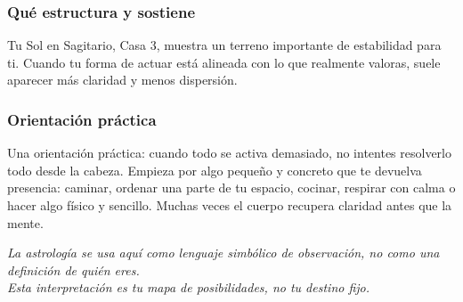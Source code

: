 \documentclass[11pt,a4paper]{article}\usepackage[utf8]{inputenc}
\begin{document}
\subsubsection*{Qué estructura y sostiene}
Tu Sol en Sagitario, Casa 3, muestra un terreno importante de estabilidad para ti. Cuando tu forma de actuar está alineada con lo que realmente valoras, suele aparecer más claridad y menos dispersión.

\subsubsection*{Orientación práctica}
Una orientación práctica: cuando todo se activa demasiado, no intentes resolverlo todo desde la cabeza. Empieza por algo pequeño y concreto que te devuelva presencia: caminar, ordenar una parte de tu espacio, cocinar, respirar con calma o hacer algo físico y sencillo. Muchas veces el cuerpo recupera claridad antes que la mente.

\vspace{1cm}
\begin{center}
{\small\itshape\color{grisai}
La astrología se usa aquí como lenguaje simbólico de observación, no como una definición de quién eres.\\
Esta interpretación es tu mapa de posibilidades, no tu destino fijo.
}
\end{center}
\end{document}
